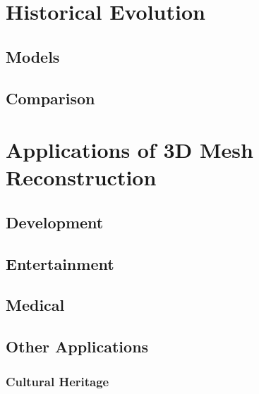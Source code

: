

\section{Historical Evolution}

\subsection{Models}

\subsection{Comparison}

\section{Applications of 3D Mesh Reconstruction}

\subsection{Development}

\subsection{Entertainment}

\subsection{Medical}

\subsection{Other Applications}

\subsubsection{Cultural Heritage}

